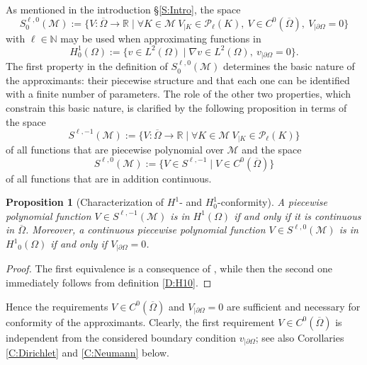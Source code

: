 \documentclass[a4paper]{amsart}
\numberwithin{equation}{section}
\theoremstyle{plain}
\newtheorem{prop}{Proposition}[section]
\theoremstyle{definition}
\begin{document}
\medskip As mentioned in the introduction \S\ref{S:Intro}, the space
\[
 {S}^{{\ell},0}_0({\mathcal{M}})
 {:=}
 \{ V:\overline\Omega\to{\mathbb{R}} \mid
   \forall{K}\in{\mathcal{M}}\ V_{|{K}}\in{\mathcal{P}_{{\ell}}({{K}})},\ 
    V\in C^0(\overline\Omega),\ 
   V_{|\partial\Omega}=0 \}
\]
with ${\ell}\in{\mathbb{N}}$ may be used when approximating functions in
\begin{equation}
\label{D:H10}
 H^1_0(\Omega)
 {:=}
 \{v\in{L^{{2}}}(\Omega) \mid
  {\nabla} v\in{L^{{2}}}(\Omega),\ 
  v_{|\partial\Omega} = 0 \}.
\end{equation}
The first property in the definition of ${S}^{{\ell},0}_0({\mathcal{M}})$
determines the basic nature of the approximants: their piecewise
structure and that each one can be identified with a finite number of
parameters.  The role of the other two properties, which constrain this basic 
nature, is clarified by the following proposition in terms of the space
\[
 {S}^{{\ell},{-1}}({\mathcal{M}})
 {:=}
 \{ V:\overline\Omega\to{\mathbb{R}} \mid
   \forall{K}\in{\mathcal{M}}\ V_{|{K}}\in{\mathcal{P}_{{\ell}}({{K}})} \}
\]
of all functions that are piecewise polynomial over ${\mathcal{M}}$ and the
space
\[
 {S}^{{\ell},0}({\mathcal{M}})
 {:=}
 \{ V\in{S}^{{\ell},{-1}} \mid
   V\in C^0(\overline\Omega) \}
\]
of all functions that are in addition continuous.

\begin{prop}[Characterization of $H^1$- and $H^1_0$-conformity]
\label{P:conforming}
  A piecewise polynomial function $V\in{S}^{{\ell},{-1}}({\mathcal{M}})$ is
  in ${H^{{1}}}(\Omega)$ if and only if it is continuous in
  $\overline\Omega$.  Moreover, a continuous piecewise polynomial
  function $V\in{S}^{{\ell},0}({\mathcal{M}})$ is in ${H^{{1}}}_0(\Omega)$
  if and only if $V_{|\partial\Omega}=0$.
\end{prop}

\begin{proof}
  The first equivalence is a consequence of
  \cite[Chapter II, Theorem 5.1]{Braess:01}, while then the second one
  immediately follows from definition \eqref{D:H10}.
\end{proof}

Hence the requirements $V\in C^0(\overline\Omega)$ and $V_{|\partial\Omega}=0$ 
are sufficient and necessary for conformity of the approximants.  Clearly, the 
first requirement $V\in C^0(\overline\Omega)$ is independent from the 
considered boundary condition $v_{|\partial\Omega}$; see also Corollaries 
\ref{C:Dirichlet} and \ref{C:Neumann} below. 
\end{document}
